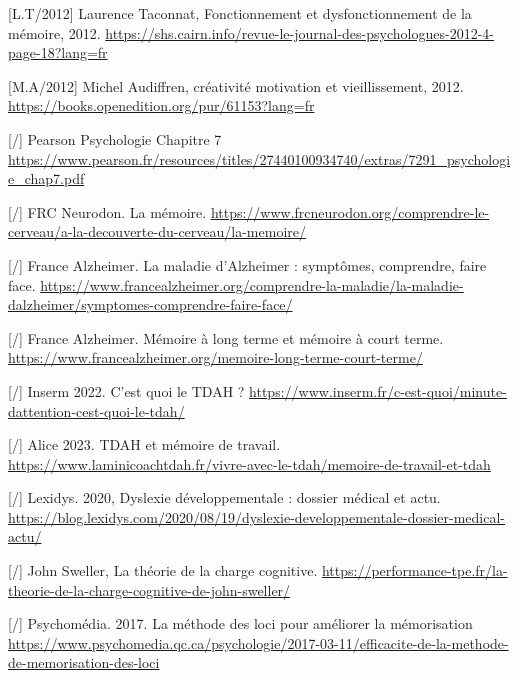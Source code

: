 \documentclass[11pt,a4paper]{report}
\begin{document}
\begin{thebibliography}{9}
        [L.T/2012] Laurence Taconnat, Fonctionnement et dysfonctionnement de la mémoire, 2012. \break
        \url{https://shs.cairn.info/revue-le-journal-des-psychologues-2012-4-page-18?lang=fr}
    
        [M.A/2012] Michel Audiffren, créativité motivation et vieillissement, 2012. \break
        \url{https://books.openedition.org/pur/61153?lang=fr}

        [/] Pearson Psychologie Chapitre 7 \break
        \url{https://www.pearson.fr/resources/titles/27440100934740/extras/7291_psychologie_chap7.pdf}
     
        [/] FRC Neurodon. La mémoire. \break
        \url{https://www.frcneurodon.org/comprendre-le-cerveau/a-la-decouverte-du-cerveau/la-memoire/}
    
        [/] France Alzheimer. La maladie d'Alzheimer : symptômes, comprendre, faire face. \break
        \url{https://www.francealzheimer.org/comprendre-la-maladie/la-maladie-dalzheimer/symptomes-comprendre-faire-face/}
    
        [/] France Alzheimer. Mémoire à long terme et mémoire à court terme. \break
        \url{https://www.francealzheimer.org/memoire-long-terme-court-terme/}
    
        [/] Inserm 2022. C’est quoi le TDAH ? \break
        \url{https://www.inserm.fr/c-est-quoi/minute-dattention-cest-quoi-le-tdah/}
    
        [/] Alice 2023. TDAH et mémoire de travail. \break
        \url{https://www.laminicoachtdah.fr/vivre-avec-le-tdah/memoire-de-travail-et-tdah}
    
        [/] Lexidys. 2020, Dyslexie développementale : dossier médical et actu. \break
        \url{https://blog.lexidys.com/2020/08/19/dyslexie-developpementale-dossier-medical-actu/}
    
        [/] John Sweller, La théorie de la charge cognitive. \break
        \url{https://performance-tpe.fr/la-theorie-de-la-charge-cognitive-de-john-sweller/}

        [/] Psychomédia. 2017. La méthode des loci pour améliorer la mémorisation \break
        \url{https://www.psychomedia.qc.ca/psychologie/2017-03-11/efficacite-de-la-methode-de-memorisation-des-loci}
    

\end{thebibliography}
\end{document}
